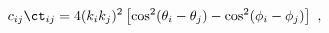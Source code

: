\begin{equation}
c_{ij}\ct_{ij}=4(k_ik_j)^2\left[ 
\cos^2(\theta_i-\theta_j)-\cos^2(\phi_i-\phi_j)\right] \ ,
\end{equation}


